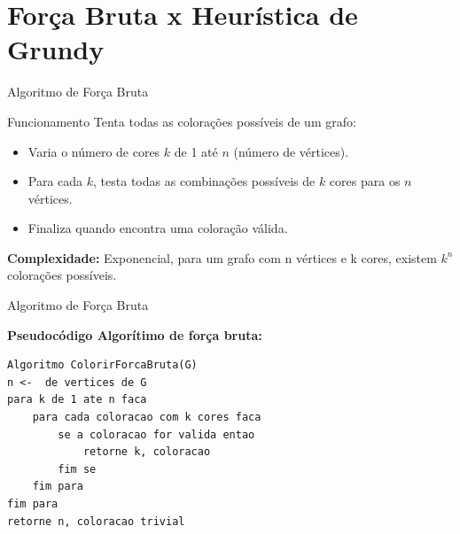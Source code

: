 \section{Força Bruta x Heurística de Grundy}

\begin{frame}{Algoritmo de Força Bruta}

\begin{block}{Funcionamento}
    Tenta todas as colorações possíveis de um grafo:

    \begin{itemize}
    \item Varia o número de cores $k$ de 1 até $n$ (número de vértices).
    \item Para cada $k$, testa todas as combinações possíveis de $k$ cores para os $n$ vértices.
    \item Finaliza quando encontra uma coloração válida.
\end{itemize}
\end{block}

\textbf{Complexidade: } 
Exponencial, para um grafo com n vértices e k cores, existem $k^n$ colorações possíveis.
\end{frame}

\begin{frame}[fragile]{Algoritmo de Força Bruta}

\textbf{Pseudocódigo Algorítimo de força bruta:}

\begin{lstlisting}[style=portugolStyle, caption={Implementação em pseudocódigo do algoritmo de força bruta}]
Algoritmo ColorirForcaBruta(G)
n <-  de vertices de G
para k de 1 ate n faca
    para cada coloracao com k cores faca
        se a coloracao for valida entao
            retorne k, coloracao
        fim se
    fim para
fim para
retorne n, coloracao trivial
\end{lstlisting}

\end{frame}

